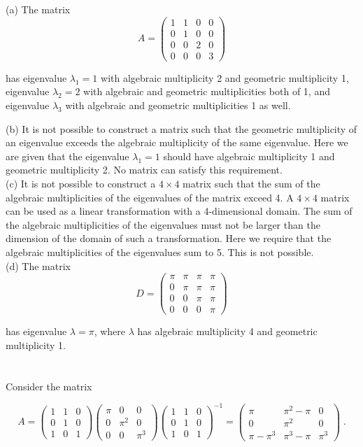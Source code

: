 \documentclass[11pt]{article}
\begin{document}
(a) The matrix $$A = \begin{pmatrix}
1 & 1 & 0 & 0 \\ 0 &1 &0 &0 \\ 0&0&2&0 \\ 0&0&0&3
\end{pmatrix}$$

has eigenvalue $\lambda_1 = 1$ with algebraic multiplicity 2 and geometric multiplicity 1, eigenvalue $\lambda_2 = 2$ with algebraic and geometric multiplicities both of 1, and eigenvalue $\lambda_3$ with algebraic and geometric multiplicities 1 as well. 

(b) It is not possible to construct a matrix such that the geometric multiplicity of an eigenvalue exceeds the algebraic multiplicity of the same eigenvalue. Here we are given that the eigenvalue $\lambda_1 = 1$ should have algebraic multiplicity 1 and geometric multiplicity 2. No matrix can satisfy this requirement. \\

(c) It is not possible to construct a $4\times 4$ matrix such that the sum of the algebraic multiplicities of the eigenvalues of the matrix exceed 4. A $4\times 4$ matrix can be used as a linear transformation with a 4-dimensional domain. The sum of the algebraic multiplicities of the eigenvalues must not be larger than the dimension of the domain of such a transformation. Here we require that the algebraic multiplicities of the eigenvalues sum to 5. This is not possible.\\

(d) The matrix
$$D = \begin{pmatrix}
\pi&\pi&\pi&\pi\\0&\pi&\pi&\pi\\0&0&\pi&\pi\\0&0&0&\pi
\end{pmatrix}$$

has eigenvalue $\lambda = \pi$, where $\lambda$ has algebraic multiplicity 4 and geometric multiplicity 1.

\section{}

Consider the matrix

$$ A = \begin{pmatrix}
1&1&0\\0&1&0\\1&0&1
\end{pmatrix} \begin{pmatrix}
\pi&0&0\\0&\pi^2&0 \\ 0&0&\pi^3
\end{pmatrix} \begin{pmatrix}
1&1&0\\0&1&0\\1&0&1
\end{pmatrix}^{-1} = \begin{pmatrix}
\pi & \pi^2-\pi & 0 \\ 0&\pi^2&0 \\ \pi-\pi^3 & \pi^3-\pi & \pi^3
\end{pmatrix}\;.$$
\end{document}
